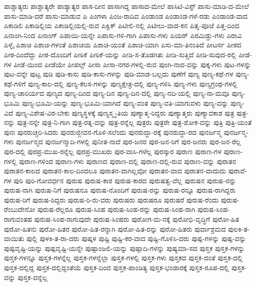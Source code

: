 {ಪಾಶ್ಚಾತ್ಯರು
ಪಾಶ್ಚಾತ್ಯರೇ
ಪಾಶ್ಯಾತ್ಯರ
ಪಾಸ-ದೀನ
ಪಾಸಾಗಿದ್ದ
ಪಾಸಾದ-ಮೇಲೆ
ಪಾಸಿಟಿ-ವಿಸ್ಟ್
ಪಾಸು-ಮಾಡಿ-ದ-ಮೇಲೆ
ಪಾಸು-ಮಾಡಿ-ದರೆ
ಪಾಸು-ಮಾಡುವ
ಪಿ
ಪಿಂಗಳಾ
ಪಿಂಜ-ರಾದಿವ
ಪಿಂಡಾಂಡ
ಪಿಂಡಾಂಡ-ಗಳೆ-ರಡು
ಪಿಂಡಾಂಡ-ವಾದ
ಪಿಕಾಡಿಲಿ
ಪಿಕಾಡಿಲ್ಲಿಯ
ಪಿಕಾಡಿಲ್ಲಿಯಲ್ಲಿ-ರುವ
ಪಿಕ್ವಿಕ್
ಪಿಟೀಲಿ-ನಲ್ಲಿ
ಪಿಟೀಲು-ವಾದ-ಕನ
ಪಿತೃ-ಪೂಜೆ
ಪಿತ್ತ-ದಿಂದ
ಪಿನಾಂಗಿ-ನಿಂದ
ಪಿನಾಂಗ್
ಪಿಪಾಯಿ-ಯನ್ನೇ
ಪಿಪಾಸು-ಗಳಿ-ಗಾಗಿ
ಪಿಪಾಸು-ಗಳು
ಪಿಯರ್
ಪಿರಮಿಡ್ಡು-ಗಳು
ಪಿರಾವಿ
ಪಿಳ್ಳೈ
ಪಿಶಾಚಿ
ಪಿಶಾಚಿ-ಗಳಂತೆ
ಪಿಶಾಚಿಯ
ಪಿಶಾಚಿ-ಯಂತೆ
ಪಿಶಾಚಿ-ಯಾಗಿ
ಪಿಸು-ಮಾ-ತಿನಂತಿದೆ
ಪೀಟರ್ಸ
ಪೀಠದ
ಪೀಠ-ದಿಂದೆದ್ದು
ಪೀಠ-ದೊಂದಿಗೆ
ಪೀಠಿಕೆ
ಪೀಠಿಕೆ-ಯನ್ನು
ಪೀಡಿ-ಸ-ತೊಡಗಿತು
ಪೀಡಿ-ಸುತ್ತಿದೆ
ಪೀಡಿ-ಸುವುದ-ರಲ್ಲಿ
ಪೀಡೆ-ಗಳ
ಪೀಡೆ-ಯಿಂದ
ಪೀಡೆಯೇ
ಪೀಪಲ್ಸ್
ಪೀಸಾ
ಪೀಸಾ-ನಗರ-ಗಳಲ್ಲಿ-ರುವ
ಪುಂಗಿ-ನಾದ-ವನ್ನು
ಪುಕ್ಕ-ಗಳು
ಪುಟ-ಗಳನ್ನು
ಪುಟ-ವನ್ನೇ
ಪುಟ್ಟ
ಪುಡಿ
ಪುಡಿ-ಕಾಸು
ಪುಡಿ-ಕಾಸು-ಗಳನ್ನು
ಪುಡಿ-ಮಾಡ-ಬಲ್ಲದು
ಪುಣೆಗೆ
ಪುಣ್ಯ
ಪುಣ್ಯ-ಕಥೆ-ಗಳ
ಪುಣ್ಯ-ಕಥೆ-ಗಳಿಗೆ
ಪುಣ್ಯ-ಕಾಲ-ದಲ್ಲಿ
ಪುಣ್ಯ-ಕೆಲಸ-ಗಳನ್ನು
ಪುಣ್ಯಕ್ಷೇತ್ರ-ದಲ್ಲಿ
ಪುಣ್ಯ-ಗಳಿಸಿ
ಪುಣ್ಯ-ಗಳು
ಪುಣ್ಯಗ್ರಂಥ-ಗಳಲ್ಲಿ
ಪುಣ್ಯ-ಚಾರಿರ್ಯದ
ಪುಣ್ಯದ
ಪುಣ್ಯ-ದಿಂದ
ಪುಣ್ಯ-ದಿನ
ಪುಣ್ಯ-ದಿನ-ದಲ್ಲಿ
ಪುಣ್ಯ-ನದಿ-ಯಲ್ಲಿ
ಪುಣ್ಯ-ನಾ-ಮವೂ
ಪುಣ್ಯ-ಭೂಮಿ
ಪುಣ್ಯ-ಭೂಮಿ-ಯನ್ನು
ಪುಣ್ಯ-ಭೂಮಿ-ಯಾಗಿದೆ
ಪುಣ್ಯ-ವಂತ
ಪುಣ್ಯ-ವತಿ-ಯಾಗುವಳು
ಪುಣ್ಯ-ವನ್ನು
ಪುಣ್ಯ-ವಿದೆ
ಪುಣ್ಯ-ವಿಶೇಷ-ವಿರ-ಬೇಕು
ಪುಣ್ಯಸ್ಥಳಕ್ಕೆ
ಪುಣ್ಯಸ್ಮೃ-ತಿಯ
ಪುಣ್ಯಾತ್ಮ-ರಿದ್ದರು
ಪುಣ್ಯಾತ್ಮರು
ಪುಣ್ಯಾವಕಾಶ
ಪುತ್ರ
ಪುತ್ರ-ನನ್ನು
ಪುತ್ರ-ನನ್ನೇ
ಪುತ್ರ-ನಿ-ಗಾಗಿ
ಪುತ್ರ-ರತ್ನ-ವನ್ನು
ಪುತ್ರ-ರನ್ನೆಲ್ಲ
ಪುತ್ರರು
ಪುತ್ರರೇ
ಪುತ್ರ-ಶೋಕ-ವನ್ನು
ಪುತ್ರಿ
ಪುತ್ರಿ-ಯಂತೆ
ಪುನಃ
ಪುನರುಚ್ಚರಿ-ಸಿದರು
ಪುನರುಜ್ಜೀವನ-ಗೊಳಿ-ಸಲೆಂದು
ಪುನರುದ್ಧಾ-ರಕ್ಕೆ
ಪುನರುದ್ಧಾ-ರದ
ಪುನರ್ಜನ್ಮ
ಪುನರ್ಜನ್ಮ-ಗಳು
ಪುನರ್ಜನ್ಮದ
ಪುನರ್ಜನ್ಮಾದಿ-ಗಳಲ್ಲಿ
ಪುನೀತ-ನಾದೆ
ಪುರ-ಜನರ
ಪುರ-ಜನ-ರಿಗೆ
ಪುರ-ಜನರು
ಪುರ-ಜನ-ರೆಲ್ಲ
ಪುರ-ದಲ್ಲಿ
ಪುರಪ್ರ-ಮುಖ-ರನ್ನೆಲ್ಲ
ಪುರಪ್ರ-ಮುಖರು
ಪುರ-ವಾಸಿ-ಗಳೆಲ್ಲ
ಪುರಸ್ಕಾರ
ಪುರಾಣ
ಪುರಾಣ-ಗಳ
ಪುರಾಣ-ಗಳಲ್ಲಿ
ಪುರಾಣ-ಗಳಿಂದ
ಪುರಾಣ-ಗಳು
ಪುರಾಣದ
ಪುರಾಣ-ದಲ್ಲಿ
ಪುರಾಣ-ದಲ್ಲಿ-ರುವ
ಪುರಾಣ-ವನ್ನು
ಪುರಾತನ
ಪುರಾತನ-ಕಾಲದ
ಪುರಾತನ-ಕಾಲ-ದಿಂದಲೂ
ಪುರಾತನ-ವಾಗಿಲ್ಲವೋ
ಪುರಾತನ-ವಾದ
ಪುರಾತನ-ವಾದುದು
ಪುರಾವೆ-ಗಳ
ಪುರಿ
ಪುರಿ-ಗೋವರ್ಧನ
ಪುರುಷ
ಪುರುಷ-ಕಾರ
ಪುರುಷ-ಕಾರದ
ಪುರುಷತ್ವ-ವೆಲ್ಲ
ಪುರುಷನ
ಪುರುಷ-ನನ್ನು
ಪುರುಷ-ನಾಗಿ
ಪುರುಷ-ನಿಗೆ
ಪುರುಷನೂ
ಪುರುಷ-ನೊಂದಿಗೆ
ಪುರುಷ-ರನ್ನು
ಪುರುಷ-ರನ್ನೂ
ಪುರುಷ-ರಾಗಿದ್ದರು
ಪುರುಷ-ರಿಗೆ
ಪುರುಷ-ರಿದ್ದರು
ಪುರುಷ-ರಿ-ರು-ವರು
ಪುರುಷರು
ಪುರುಷರೂ
ಪುರುಷರೆ
ಪುರುಷ-ರೆಂದು
ಪುರುಷ-ರೆಂಬುದೇನೋ
ಪುರುಷ-ರೆಲ್ಲರೂ
ಪುರುಷ-ಸಿಂಹ
ಪುರುಷ-ಸಿಂಹ-ರನ್ನು
ಪುರುಷ-ಸಿಂಹ-ರಾಗಿ
ಪುರುಷ-ಸಿಂಹ-ರಾಗುವಂತಹ
ಪುರುಷ-ಸಿಂಹ-ರಾಗುವುದೇ
ಪುರುಷ-ಸಿಂಹರು
ಪುರೋಗ-ಮ-ನಕ್ಕೆ
ಪುರೋಭಿ-ವೃದ್ಧಿಗೆ
ಪುರೋ-ಹಿತ
ಪುರೋ-ಹಿತನು
ಪುರೋ-ಹಿತರ
ಪುರೋ-ಹಿತ-ರನ್ನಾಗಿ
ಪುರೋ-ಹಿತ-ರನ್ನು
ಪುರೋ-ಹಿತರು
ಪುರ್ವಾಶ್ರಮದ
ಪುಲಕಿ-ತ-ವಾಯಿತು
ಪುಲ್ಲಿ
ಪುಳಕಿ-ತ-ರಾ-ದರು
ಪುಷ್ಕಳ
ಪುಷ್ಟಿ
ಪುಷ್ಟಿ-ಕರ-ವಾದ
ಪುಷ್ಟಿ-ಗೊಳಿಸಿ-ದರು
ಪುಷ್ಪ-ಗಳನ್ನು
ಪುಷ್ಪ-ವನ್ನು
ಪುಷ್ಪವೃಷ್ಟಿ-ಯನ್ನು
ಪುಷ್ಪವೃಷ್ಟಿ-ಯನ್ನೇ
ಪುಷ್ಪಾಂಜಲಿ-ಯನ್ನು
ಪುಷ್ಪಾದಿ-ಗಳನ್ನು
ಪುಷ್ಯಮಾ-ಸದ
ಪುಸ್ತಕ
ಪುಸ್ತಕ-ಗಳನ್ನು
ಪುಸ್ತಕ-ಗಳನ್ನೂ
ಪುಸ್ತಕ-ಗಳನ್ನೆಲ್ಲ
ಪುಸ್ತಕ-ಗಳನ್ನೆಲ್ಲಾ
ಪುಸ್ತಕ-ಗಳಲ್ಲಿ
ಪುಸ್ತಕ-ಗಳು
ಪುಸ್ತಕದ
ಪುಸ್ತಕ-ದಂತೆ
ಪುಸ್ತಕ-ದಲ್ಲಿ
ಪುಸ್ತಕ-ದಲ್ಲಿದ್ದ
ಪುಸ್ತಕ-ದಲ್ಲಿದ್ದಂತೆಯೆ
ಪುಸ್ತಕ-ದಿಂದ
ಪುಸ್ತಕ-ಪಾಂಡಿತ್ಯ
ಪುಸ್ತಕ-ಭಂಡಾರಕ್ಕೆ
ಪುಸ್ತಕ-ರೂಪ-ದಲ್ಲಿ
ಪುಸ್ತಕ-ವನ್ನು
ಪುಸ್ತಕ-ವನ್ನೆಲ್ಲ
}
